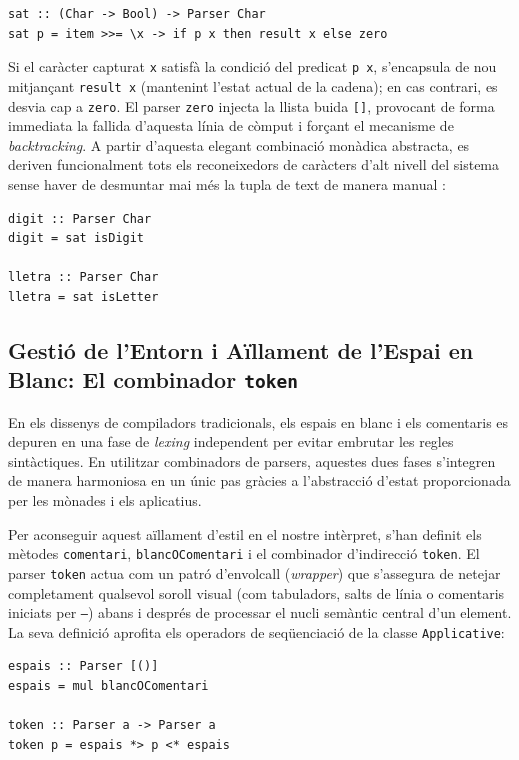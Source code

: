 \begin{lstlisting}[style=haskellstyle, caption=Combinador monàdic condicional sat]
sat :: (Char -> Bool) -> Parser Char
sat p = item >>= \x -> if p x then result x else zero
\end{lstlisting}

Si el caràcter capturat \texttt{x} satisfà la condició del predicat \texttt{p x}, s'encapsula de nou mitjançant \texttt{result x} (mantenint l'estat actual de la cadena); en cas contrari, es desvia cap a \texttt{zero}. El parser \texttt{zero} injecta la llista buida \texttt{[]}, provocant de forma immediata la fallida d'aquesta línia de còmput i forçant el mecanisme de \textit{backtracking}. A partir d'aquesta elegant combinació monàdica abstracta, es deriven funcionalment tots els reconeixedors de caràcters d'alt nivell del sistema sense haver de desmuntar mai més la tupla de text de manera manual \cite{hutton1998monadic}:

\begin{lstlisting}[style=haskellstyle, caption=Derivació declarativa de parsers de caràcters]
digit :: Parser Char
digit = sat isDigit

lletra :: Parser Char
lletra = sat isLetter
\end{lstlisting}

\subsection{Gestió de l'Entorn i Aïllament de l'Espai en Blanc: El combinador \texttt{token}}
En els dissenys de compiladors tradicionals, els espais en blanc i els comentaris es depuren en una fase de \textit{lexing} independent per evitar embrutar les regles sintàctiques. En utilitzar combinadors de parsers, aquestes dues fases s'integren de manera harmoniosa en un únic pas gràcies a l'abstracció d'estat proporcionada per les mònades i els aplicatius.

Per aconseguir aquest aïllament d'estil en el nostre intèrpret, s'han definit els mètodes \texttt{comentari}, \texttt{blancOComentari} i el combinador d'indirecció \texttt{token}. El parser \texttt{token} actua com un patró d'envolcall (\textit{wrapper}) que s'assegura de netejar completament qualsevol soroll visual (com tabuladors, salts de línia o comentaris iniciats per \texttt{--}) abans i després de processar el nucli semàntic central d'un element. La seva definició aprofita els operadors de seqüenciació de la classe \texttt{Applicative}:

\begin{lstlisting}[style=haskellstyle, caption=Neteja de traces i comentaris mitjançant el combinador token]
espais :: Parser [()]
espais = mul blancOComentari

token :: Parser a -> Parser a
token p = espais *> p <* espais
\end{lstlisting}

